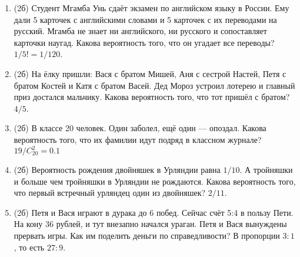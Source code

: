 \documentclass[a4paper, 12pt]{article}
\begin{document}
\newpage
\begin{enumerate}[resume]
  \item (2б) Студент Мгамба Унь сдаёт экзамен по английском языку в России. Ему дали 5 карточек с английскими словами и 5 карточек с их переводами на русский. Мгамба не знает ни английского, ни русского и сопоставляет карточки наугад. Какова вероятность того, что он угадает все переводы? $1/5!=1/120$.
  \item (2б) На ёлку пришли: Вася с братом Мишей, Аня с сестрой Настей, Петя с братом Костей и Катя с братом Васей. Дед Мороз устроил лотерею и главный приз достался мальчику. Какова вероятность того, что тот пришёл с братом? $4/5$.
  \item (2б) В классе 20 человек. Один заболел, ещё один — опоздал. Какова вероятность того, что их фамилии идут подряд в классном журнале? $19/C_{20}^2=0.1$
  \item (2б) Вероятность рождения двойняшек в Урляндии равна $1/10$. А тройняшки и больше чем тройняшки в Урляндии не рождаются. Какова вероятность того, что первый встречный урляндец один из двойняшек? $2/11$.
  \item (2б) Петя и Вася играют в дурака до 6 побед. Сейчас счёт 5:4 в пользу Пети. На кону 36 рублей, и тут внезапно начался ураган. Петя и Вася вынуждены прервать игры. Как им поделить деньги по справедливости? В пропорции $3:1$, то есть $27:9$.


\end{enumerate}
\end{document}
